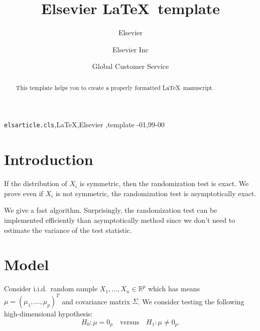 \documentclass[review]{elsarticle}
\theoremstyle{plain}
\theoremstyle{definition}
\theoremstyle{remark}
\begin{document}
\begin{frontmatter}

\title{Elsevier \LaTeX\ template}

\author{Elsevier}
\address{Radarweg 29, Amsterdam}

\author[mymainaddress,mysecondaryaddress]{Elsevier Inc}

\author[mysecondaryaddress]{Global Customer Service}

\address[mymainaddress]{1600 John F Kennedy Boulevard, Philadelphia}
\address[mysecondaryaddress]{360 Park Avenue South, New York}

\begin{abstract}
This template helps you to create a properly formatted \LaTeX\ manuscript.
\end{abstract}

\begin{keyword}
\texttt{elsarticle.cls}\sep \LaTeX\sep Elsevier \sep template
-01\sep  99-00
\end{keyword}

\end{frontmatter}

\linenumbers


\section{Introduction}
If the distribution of $X_i$ is symmetric, then the randomization test is exact. We prove even if $X_i$ is not symmetric, the randomization test is asymptotically exact.

We give a fast algorithm. Surprisingly, the randomization test can be implemented efficiently than asymptotically method since we don't need to estimate the variance of the test statistic.
\section{Model}

Consider i.i.d.\ random sample $X_{1},\ldots,X_{n}\in \mathbb{R}^p$ which has means $\mu={(\mu_1,\ldots,\mu_p)}^T$ and covariance matrix $\Sigma$. We consider testing the following high-dimensional hypothesis:
\begin{equation}
    H_0:\mu=0_p\quad \textrm{versus} \quad H_1:\mu\neq 0_p.
\end{equation}
\end{document}

